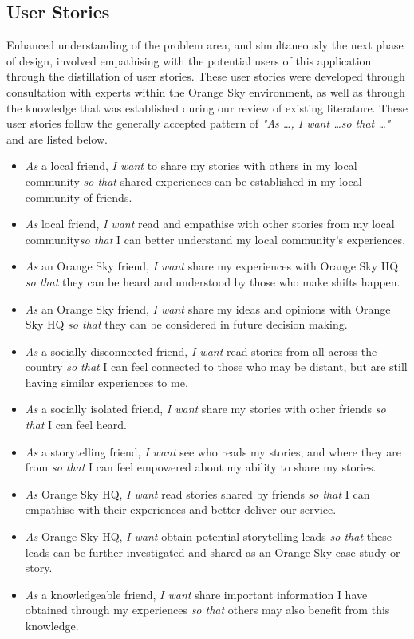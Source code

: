 \subsection{User Stories}

Enhanced understanding of the problem area, and simultaneously the next phase of design, involved empathising with the potential users of this application through the distillation of user stories.
These user stories were developed through consultation with experts within the Orange Sky environment, as well as through the knowledge that was established during our review of existing literature.
These user stories follow the generally accepted pattern of \emph{"As \ldots, I want \ldots so that \ldots"} and are listed below.

\begin{itemize}
    \item \emph{As} a local friend, \emph{I want} to share my stories with others in my local community \emph{so that} shared experiences can be established in my local community of friends.
    \item \emph{As} local friend, \emph{I want} read and empathise with other stories from my local community\emph{so that} I can better understand my local community's experiences.
    \item \emph{As} an Orange Sky friend, \emph{I want} share my experiences with Orange Sky HQ \emph{so that} they can be heard and understood by those who make shifts happen.
    \item \emph{As} an Orange Sky friend, \emph{I want} share my ideas and opinions with Orange Sky HQ \emph{so that} they can be considered in future decision making.
    \item \emph{As} a socially disconnected friend, \emph{I want} read stories from all across the country \emph{so that} I can feel connected to those who may be distant, but are still having similar experiences to me.
    \item \emph{As} a socially isolated friend, \emph{I want} share my stories with other friends \emph{so that} I can feel heard.
    \item \emph{As} a storytelling friend, \emph{I want} see who reads my stories, and where they are from \emph{so that} I can feel empowered about my ability to share my stories.
    \item \emph{As} Orange Sky HQ, \emph{I want} read stories shared by friends \emph{so that} I can empathise with their experiences and better deliver our service.
    \item \emph{As} Orange Sky HQ, \emph{I want} obtain potential storytelling leads \emph{so that} these leads can be further investigated and shared as an Orange Sky case study or story.
    \item \emph{As} a knowledgeable friend, \emph{I want} share important information I have obtained through my experiences \emph{so that} others may also benefit from this knowledge.
\end{itemize}

